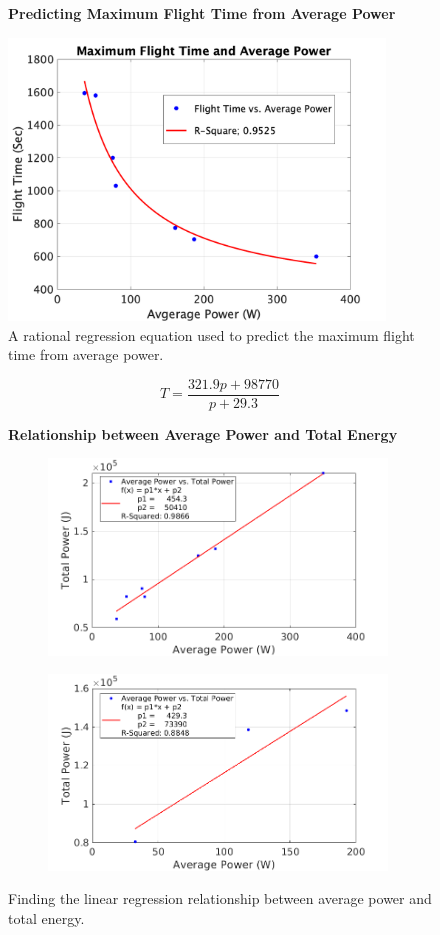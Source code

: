 \documentclass{article}
\begin{document}
\begin{figure}
  \centering
  \large{\textbf{Predicting Maximum Flight Time from Average Power}}\par
  \includegraphics[width = 100mm]{images/FlightTime.png}
  \caption{A rational regression equation used to predict the maximum flight time from average power.}
  \label{fig:flighttime}
\end{figure}

\begin{equation}
T={\frac {321.9p + 98770}{p + 29.3}}
\end{equation}

\begin{figure}
\centering
\large{\textbf{Relationship between Average Power and Total Energy}}\par
\begin{subfigure}[b]{0.5\textwidth}
  \centering
   \includegraphics[width=90mm]{images/AvgTotPwr.png}
\end{subfigure}
\begin{subfigure}[b]{0.5\textwidth}
  \centering
  \includegraphics[width=90mm]{images/AvgTotPwr2.png}
\end{subfigure}
\caption{Finding the linear regression relationship between average power and total energy.}
\label{fig:avgtotpwr}
\end{figure}
\end{document}
